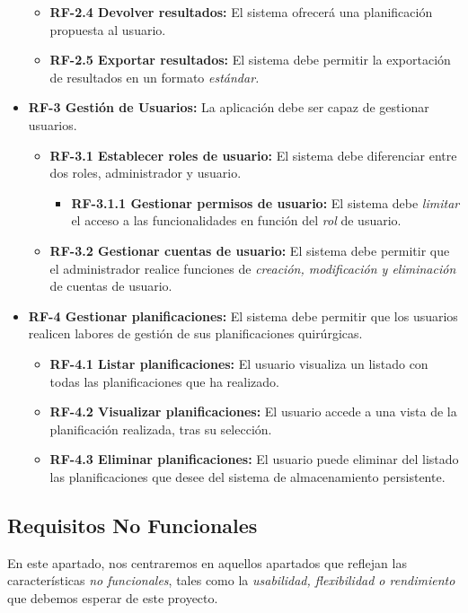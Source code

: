 \begin{itemize}
\begin{itemize}
        \item \textbf{RF-2.4 Devolver resultados:} El sistema ofrecerá una planificación propuesta al usuario.
        \item \textbf{RF-2.5 Exportar resultados:} El sistema debe permitir la exportación de resultados en un formato \textit{estándar.} 
    \end{itemize}
    \item \textbf{RF-3 Gestión de Usuarios:} La aplicación debe ser capaz de gestionar usuarios.
    \begin{itemize}
        \item \textbf{RF-3.1 Establecer roles de usuario:} El sistema debe diferenciar entre dos roles, administrador y usuario.
        \begin{itemize}
            \item \textbf{RF-3.1.1 Gestionar permisos de usuario:} El sistema debe \textit{limitar} el acceso a las funcionalidades en función del \textit{rol} de usuario.
        \end{itemize}
        \item \textbf{RF-3.2 Gestionar cuentas de usuario:} El sistema debe permitir que el administrador realice funciones de \textit{creación, modificación y eliminación} de cuentas de usuario.
    \end{itemize}
    \item \textbf{RF-4 Gestionar planificaciones:} El sistema debe permitir que los usuarios realicen labores de gestión de sus planificaciones quirúrgicas.
    \begin{itemize}
        \item \textbf{RF-4.1 Listar planificaciones:} El usuario visualiza un listado con todas las planificaciones que ha realizado.
        \item \textbf{RF-4.2 Visualizar planificaciones:} El usuario accede a una vista de la planificación realizada, tras su selección.
        \item \textbf{RF-4.3 Eliminar planificaciones:} El usuario puede eliminar del listado las planificaciones que desee del sistema de almacenamiento persistente.
    \end{itemize}
\end{itemize}


\subsection{Requisitos No Funcionales}

En este apartado, nos centraremos en aquellos apartados que reflejan las características \textit{no funcionales}, tales como la \textit{usabilidad, flexibilidad o rendimiento} que debemos esperar de este proyecto.\cite{Chung2009OnEngineering}

